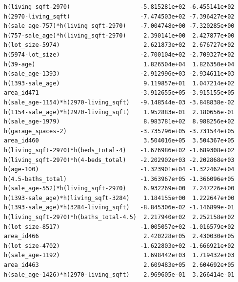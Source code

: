 \documentclass[
]{article}
\begin{document}
\begin{verbatim}
h(living_sqft-2970)                    -5.815281e+02 -6.455141e+02
h(2970-living_sqft)                    -7.474503e+02 -7.396427e+02
h(sale_age-757)*h(living_sqft-2970)    -7.004748e+00 -7.320285e+00
h(757-sale_age)*h(living_sqft-2970)     2.390141e+00  2.427877e+00
h(lot_size-5974)                        2.621873e+02  2.676727e+02
h(5974-lot_size)                       -2.700104e+02 -2.709327e+02
h(39-age)                               1.826504e+04  1.826350e+04
h(sale_age-1393)                       -2.912996e+03 -2.934611e+03
h(1393-sale_age)                        9.119857e+01  1.047214e+02
area_id471                             -3.912655e+05 -3.915155e+05
h(sale_age-1154)*h(2970-living_sqft)   -9.148544e-03 -3.848838e-02
h(1154-sale_age)*h(2970-living_sqft)    1.952883e-01  2.180656e-01
h(sale_age-1979)                        8.983781e+02  8.988256e+02
h(garage_spaces-2)                     -3.735796e+05 -3.731544e+05
area_id460                              3.504016e+05  3.504367e+05
h(living_sqft-2970)*h(beds_total-4)    -1.676986e+02 -1.689308e+02
h(living_sqft-2970)*h(4-beds_total)    -2.202902e+03 -2.202868e+03
h(age-100)                             -1.323901e+04 -1.322462e+04
h(4.5-baths_total)                     -1.363967e+05 -1.366096e+05
h(sale_age-552)*h(living_sqft-2970)     6.932269e+00  7.247226e+00
h(1393-sale_age)*h(living_sqft-3284)    1.184155e+00  1.222647e+00
h(1393-sale_age)*h(3284-living_sqft)   -8.845306e-02 -1.146899e-01
h(living_sqft-2970)*h(baths_total-4.5)  2.217940e+02  2.252158e+02
h(lot_size-8517)                       -1.005057e+02 -1.016579e+02
area_id466                              2.420228e+05  2.430030e+05
h(lot_size-4702)                       -1.622803e+02 -1.666921e+02
h(sale_age-1192)                        1.698442e+03  1.719432e+03
area_id463                              2.609483e+05  2.604692e+05
h(sale_age-1426)*h(2970-living_sqft)    2.969605e-01  3.266414e-01
                                                                  

\end{verbatim}
\end{document}
